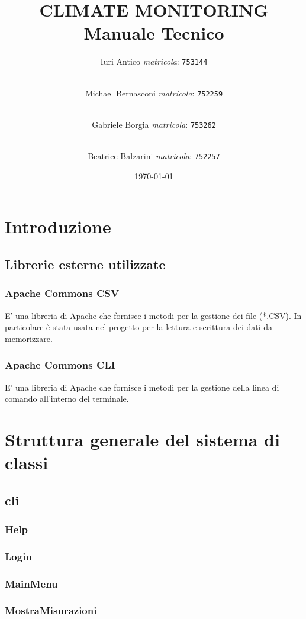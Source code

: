 \documentclass[a4paper, 12pt]{report}
\title {
	CLIMATE MONITORING \\
	Manuale Tecnico}
\author{
	Iuri Antico \textit{matricola}:
	\texttt{753144}
	\and \\
	Michael Bernasconi \textit{matricola}:
	\texttt{752259}
	\and \\
	Gabriele Borgia \textit{matricola}:
	\texttt{753262}
	\and \\
	Beatrice Balzarini \textit{matricola}:
	\texttt{752257}
}
\date{\today}
\begin{document}
	\makeatletter
	\begin{titlepage}
		\maketitle
	\end{titlepage}
	\makeatother

	\tableofcontents
	\listoffigures
	\listoftables

	\chapter{Introduzione}
		\section{Librerie esterne utilizzate}
			\subsection{Apache Commons CSV}
			E' una libreria di Apache che fornisce i metodi per la gestione dei file (*.CSV). In particolare è stata usata nel progetto per la lettura e scrittura dei dati da memorizzare.
			\subsection{Apache Commons CLI}
			E' una libreria di Apache che fornisce i metodi per la gestione della linea di comando all'interno del terminale.

	\chapter{Struttura generale del sistema di classi}
		\section{cli}
			\subsection{Help}
			\subsection{Login}
			\subsection{MainMenu}
			\subsection{MostraMisurazioni}
\end{document}
